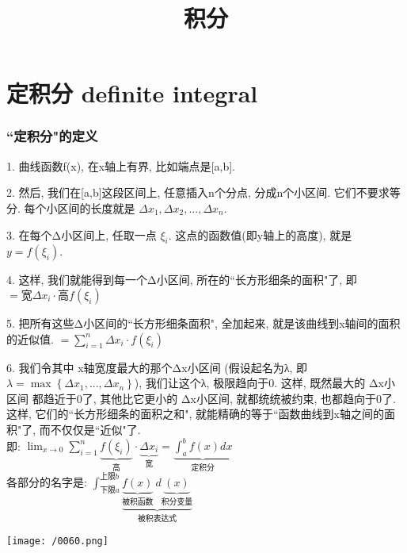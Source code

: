 \documentclass[UTF8]{ctexart}
\title{积分}
\begin{document}
	\tableofcontents %
	\date{} %
	\maketitle  %
	
	\part{定积分 definite integral}
	
	
	\section{``定积分"的定义}
	
	1. 曲线函数f(x), 在x轴上有界, 比如端点是[a,b].
	
	2. 然后, 我们在[a,b]这段区间上, 任意插入n个分点, 分成n个小区间. 它们不要求等分. 每个小区间的长度就是 $ \Delta x_1, \Delta x_2,..., \Delta x_n$.
	
	3. 在每个Δ小区间上, 任取一点 $ \xi_i$. 这点的函数值(即y轴上的高度), 就是 $ y=f(\xi_i)$.
	
	4. 这样, 我们就能得到每一个Δ小区间, 所在的``长方形细条的面积"了, 即 $= \text{宽} \Delta x_i \cdot \text{高}f(\xi_i)$
	
	5. 把所有这些Δ小区间的``长方形细条面积", 全加起来, 就是该曲线到x轴间的面积的近似值. $ = \sum_{i=1}^n \Delta x_i\cdot f(\xi _i) $
	
	6. 我们令其中 x轴宽度最大的那个Δx小区间 (假设起名为λ, 即$ \lambda =\max \left\{ \varDelta x_1,...,\varDelta x_n \right\} $), 我们让这个λ, 极限趋向于0. 这样, 既然最大的 Δx小区间 都趋近于0了, 其他比它更小的 Δx小区间, 就都统统被约束, 也都趋向于0了. 这样, 它们的``长方形细条的面积之和", 就能精确的等于``函数曲线到x轴之间的面积"了, 而不仅仅是``近似"了. \\
	
	即: 
	$	\lim_{x\rightarrow 0}\sum_{i=1}^n{\underset{\text{高}}{\underbrace{f\left( \xi _i \right) }}\cdot \underset{\text{宽}}{\underbrace{\varDelta x_i}}=\underset{\text{定积分}}{\underbrace{\int_a^b{f\left( x \right)}dx}}}	$ \\
	
	各部分的名字是:
	$
	\int_{\text{下限}a}^{\text{上限}b}{\underset{\text{被积表达式}}{\underbrace{\underset{\text{被积函数}}{\underbrace{f\left( x \right) }}\ d\underset{\text{积分变量}}{\underbrace{\left( x \right) }}}}}
	$
	
	\texttt{[image: /0060.png]}
	
\end{document}
